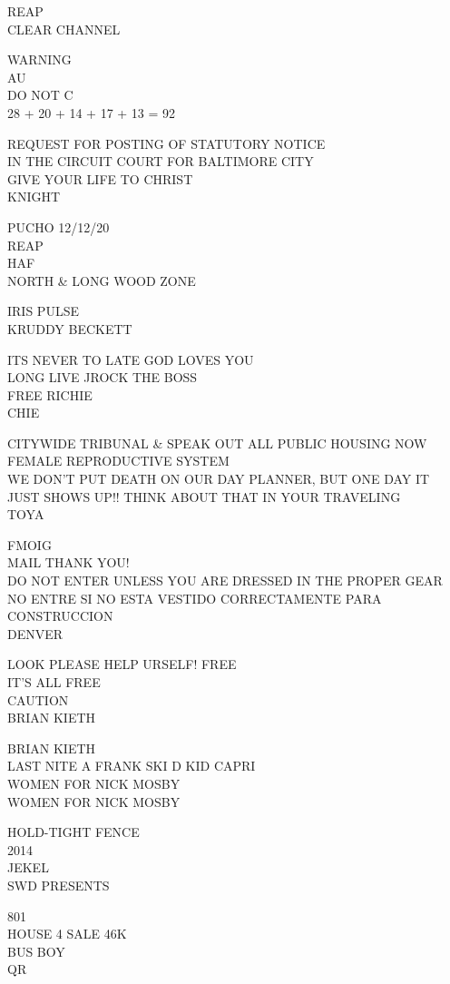 \documentclass[10pt,letterpaper]{article}
\begin{document}
REAP\\
CLEAR CHANNEL

WARNING\\
AU\\
DO NOT C\\
28 + 20 + 14 + 17 + 13 = 92

REQUEST FOR POSTING OF STATUTORY NOTICE\\
IN THE CIRCUIT COURT FOR BALTIMORE CITY\\
GIVE YOUR LIFE TO CHRIST\\
KNIGHT

PUCHO 12/12/20\\
REAP\\
HAF\\
NORTH \& LONG WOOD ZONE

IRIS PULSE\\
KRUDDY BECKETT

ITS NEVER TO LATE GOD LOVES YOU\\
LONG LIVE JROCK THE BOSS\\
FREE RICHIE\\
CHIE

CITYWIDE TRIBUNAL \& SPEAK OUT ALL PUBLIC HOUSING NOW\\
FEMALE REPRODUCTIVE SYSTEM\\
WE DON'T PUT DEATH ON OUR DAY PLANNER, BUT ONE DAY IT JUST SHOWS UP!! THINK ABOUT THAT IN YOUR TRAVELING\\
TOYA

FMOIG\\
MAIL THANK YOU!\\
DO NOT ENTER UNLESS YOU ARE DRESSED IN THE PROPER GEAR NO ENTRE SI NO ESTA VESTIDO CORRECTAMENTE PARA CONSTRUCCION\\
DENVER

LOOK PLEASE HELP URSELF!  FREE\\
IT'S ALL FREE\\
CAUTION\\
BRIAN KIETH

BRIAN KIETH\\
LAST NITE A FRANK SKI D KID CAPRI\\
WOMEN FOR NICK MOSBY\\
WOMEN FOR NICK MOSBY

HOLD{-}TIGHT FENCE\\
2014\\
JEKEL\\
SWD PRESENTS

801\\
HOUSE 4 SALE 46K\\
BUS BOY\\
QR
\end{document}

